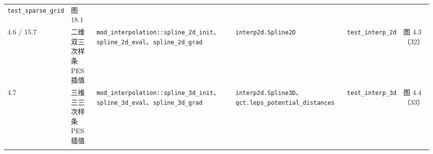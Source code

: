 \documentclass[
]{ctexbook}
\begin{document}
\begin{longtable}[]{@{}llllll@{}}
\begin{minipage}[t]{0.14\columnwidth}
\texttt{test\_sparse\_grid}\strut
\end{minipage} & \begin{minipage}[t]{0.14\columnwidth}\raggedright
图 18.1\strut
\end{minipage}\tabularnewline
\begin{minipage}[t]{0.14\columnwidth}\raggedright
4.6 / 15.7\strut
\end{minipage} & \begin{minipage}[t]{0.14\columnwidth}\raggedright
二维双三次样条 PES 插值\strut
\end{minipage} & \begin{minipage}[t]{0.14\columnwidth}\raggedright
\texttt{mod\_interpolation::spline\_2d\_init}、\texttt{spline\_2d\_eval}、\texttt{spline\_2d\_grad}\strut
\end{minipage} & \begin{minipage}[t]{0.14\columnwidth}\raggedright
\texttt{interp2d.Spline2D}\strut
\end{minipage} & \begin{minipage}[t]{0.14\columnwidth}\raggedright
\texttt{test\_interp\_2d}\strut
\end{minipage} & \begin{minipage}[t]{0.14\columnwidth}\raggedright
图 4.3（32）\strut
\end{minipage}\tabularnewline
\begin{minipage}[t]{0.14\columnwidth}\raggedright
4.7\strut
\end{minipage} & \begin{minipage}[t]{0.14\columnwidth}\raggedright
三维三三次样条 PES 插值\strut
\end{minipage} & \begin{minipage}[t]{0.14\columnwidth}\raggedright
\texttt{mod\_interpolation::spline\_3d\_init}、\texttt{spline\_3d\_eval}、\texttt{spline\_3d\_grad}\strut
\end{minipage} & \begin{minipage}[t]{0.14\columnwidth}\raggedright
\texttt{interp2d.Spline3D}、\texttt{qct.leps\_potential\_distances}\strut
\end{minipage} & \begin{minipage}[t]{0.14\columnwidth}\raggedright
\texttt{test\_interp\_3d}\strut
\end{minipage} & \begin{minipage}[t]{0.14\columnwidth}\raggedright
图 4.4（33）\strut
\end{minipage}\tabularnewline
\begin{minipage}[t]{0.14\columnwidth}\raggedright

\end{minipage}
\end{longtable}
\end{document}
